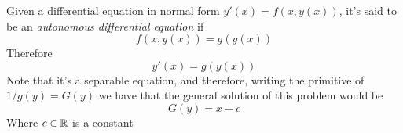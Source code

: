 \documentclass[../complete.tex]{subfiles}
\begin{document}
\begin{dfn}
	Given a differential equation in normal form $y'(x)=f(x,y(x))$, it's said to be an \textit{autonomous differential equation} if
	\begin{equation*}
		f(x,y(x))=g(y(x))
	\end{equation*}
	Therefore
	\begin{equation}
		y'(x)=g(y(x))
		\label{eq:autonomousode}
	\end{equation}
	Note that it's a separable equation, and therefore, writing the primitive of $1/g(y)=G(y)$ we have that the general solution of this problem would be
	\begin{equation*}
		G(y)=x+c
	\end{equation*}
	Where $c\in\mathbb{R}$ is a constant
\end{dfn}
\end{document}
